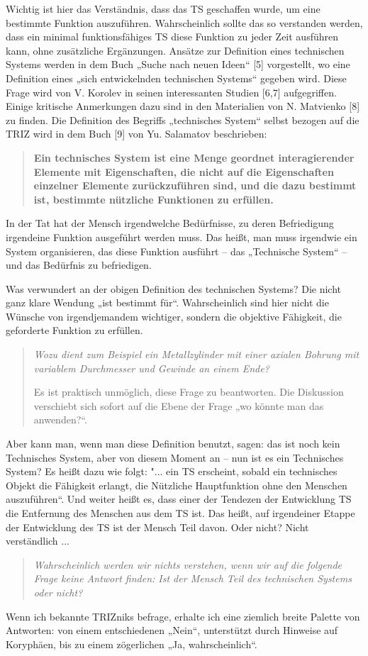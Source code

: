 \documentclass[11pt,a4paper]{article}
\begin{document}
Wichtig ist hier das Verständnis, dass das TS geschaffen wurde, um eine
bestimmte Funktion auszuführen. Wahrscheinlich sollte das so verstanden
werden, dass ein minimal funktionsfähiges TS diese Funktion zu jeder Zeit
ausführen kann, ohne zusätzliche Ergänzungen. Ansätze zur Definition eines
technischen Systems werden in dem Buch „Suche nach neuen Ideen“ [5]
vorgestellt, wo eine Definition eines „sich entwickelnden technischen Systems“
gegeben wird. Diese Frage wird von V. Korolev in seinen interessanten Studien
[6,7] aufgegriffen. Einige kritische Anmerkungen dazu sind in den Materialien
von N. Matvienko [8] zu finden. Die Definition des Begriffs „technisches
System“ selbst bezogen auf die TRIZ wird in dem Buch [9] von Yu. Salamatov
beschrieben: 
\begin{quote}\bf
  Ein technisches System ist eine Menge geordnet interagierender Elemente mit
  Eigenschaften, die nicht auf die Eigenschaften einzelner Elemente
  zurückzuführen sind, und die dazu bestimmt ist, bestimmte nützliche
  Funktionen zu erfüllen. 
\end{quote}
In der Tat hat der Mensch irgendwelche Bedürfnisse, zu deren Befriedigung
irgendeine Funktion ausgeführt werden muss. Das heißt, man muss irgendwie ein
System organisieren, das diese Funktion ausführt -- das „Technische System“ --
und das Bedürfnis zu befriedigen.

Was verwundert an der obigen Definition des technischen Systems? Die nicht
ganz klare Wendung „ist bestimmt für“. Wahrscheinlich sind hier nicht die
Wünsche von irgendjemandem wichtiger, sondern die objektive Fähigkeit, die
geforderte Funktion zu erfüllen.  
\begin{quote}\it
  Wozu dient zum Beispiel ein Metallzylinder mit einer axialen Bohrung mit
  variablem Durchmesser und Gewinde an einem Ende?

  Es ist praktisch unmöglich, diese Frage zu beantworten. Die Diskussion
  verschiebt sich sofort auf die Ebene der Frage „wo könnte man das
  anwenden?“.
\end{quote}
Aber kann man, wenn man diese Definition benutzt, sagen: das ist noch kein
Technisches System, aber von diesem Moment an -- nun ist es ein Technisches
System? Es heißt dazu wie folgt: "... ein TS erscheint, sobald ein technisches
Objekt die Fähigkeit erlangt, die Nützliche Hauptfunktion ohne den Menschen
auszuführen“. Und weiter heißt es, dass einer der Tendezen der Entwicklung TS
die Entfernung des Menschen aus dem TS ist. Das heißt, auf irgendeiner Etappe
der Entwicklung des TS ist der Mensch Teil davon. Oder nicht?
Nicht verständlich ...  
\begin{quote}\it
  Wahrscheinlich werden wir nichts verstehen, wenn wir auf die folgende Frage
  keine Antwort finden: Ist der Mensch Teil des technischen Systems oder
  nicht?
\end{quote}
Wenn ich bekannte TRIZniks befrage, erhalte ich eine ziemlich breite Palette
von Antworten: von einem entschiedenen „Nein“, unterstützt durch Hinweise auf
Koryphäen, bis zu einem zögerlichen „Ja, wahrscheinlich“.
\end{document}
